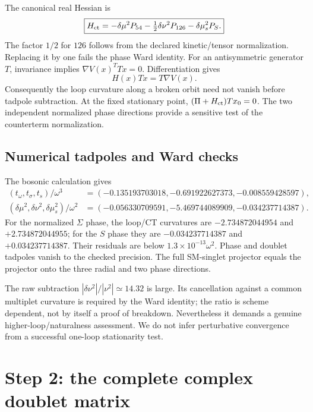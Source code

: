 \documentclass[11pt]{article}
\begin{document}
The canonical real Hessian is
\begin{equation}
 \boxed{H_{\rm ct}=-\delta\mu^2P_{54}
 -\tfrac12\delta\nu^2P_{126}-\delta\mu_s^2P_S.}
\label{eq:CT}
\end{equation}
The factor $1/2$ for $126$ follows from the declared kinetic/tensor
normalization. Replacing it by one fails the phase Ward identity.
For an antisymmetric generator $T$, invariance implies
$\nabla V(x)^TTx=0$. Differentiation gives
\begin{equation}
 H(x)Tx=T\nabla V(x).
\end{equation}
Consequently the loop curvature along a broken orbit need not vanish
before tadpole subtraction. At the fixed stationary point,
$(\Pi+H_{\rm ct})Tx_0=0$. The two independent normalized phase directions
provide a sensitive test of the counterterm normalization.

\subsection{Numerical tadpoles and Ward checks}
The bosonic calculation gives
\begin{align}
 (t_\omega,t_\sigma,t_s)/\omega^3
 &=(-0.135193703018,-0.691922627373,-0.008559428597),\\
 (\delta\mu^2,\delta\nu^2,\delta\mu_s^2)/\omega^2
 &=(-0.056330709591,-5.469744089909,-0.034237714387).
\end{align}
For the normalized $\Sigma$ phase, the loop/CT curvatures are
$-2.734872044954$ and $+2.734872044955$; for the $S$ phase they are
$-0.034237714387$ and $+0.034237714387$. Their residuals are below
$1.3\times10^{-13}\omega^2$. Phase and doublet tadpoles vanish to the
checked precision. The full SM-singlet projector equals the projector onto
the three radial and two phase directions.

The raw subtraction $|\delta\nu^2|/|\nu^2|\simeq14.32$ is large.
Its cancellation against a common multiplet curvature is required by the
Ward identity; the ratio is scheme dependent, not by itself a proof of
breakdown. Nevertheless it demands a genuine higher-loop/naturalness
assessment. We do not infer perturbative convergence from a successful
one-loop stationarity test.

\section{Step 2: the complete complex doublet matrix}
\end{document}
